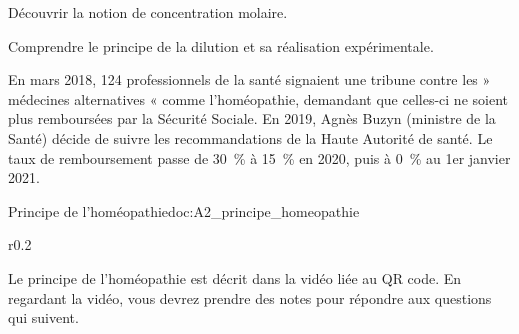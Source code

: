 \tetePremStssChim



\begin{objectifs}
  \item Découvrir la notion de concentration molaire.
  \item Comprendre le principe de la dilution et sa réalisation expérimentale.
\end{objectifs}

\begin{contexte}
  En mars 2018, 124 professionnels de la santé signaient une tribune contre les » médecines alternatives « comme l’homéopathie, demandant que celles-ci ne soient plus remboursées par la Sécurité Sociale.
  En 2019, Agnès Buzyn (ministre de la Santé) décide de suivre les recommandations de la Haute Autorité de santé.
  Le taux de remboursement passe de \qty{30}{\percent} à \qty{15}{\percent} en 2020, puis à \qty{0}{\percent} au 1er janvier 2021. 
  
\end{contexte}


\begin{doc}{Principe de l'homéopathie}{doc:A2_principe_homeopathie}
  \begin{wrapfigure}{r}{0.2\linewidth}
    \vspace*{-30pt}
    \centering
  \end{wrapfigure}
  
  Le principe de l'homéopathie est décrit dans la vidéo liée au QR code.
  En regardant la vidéo, vous devrez prendre des notes pour répondre aux questions qui suivent.
  
\end{doc}


